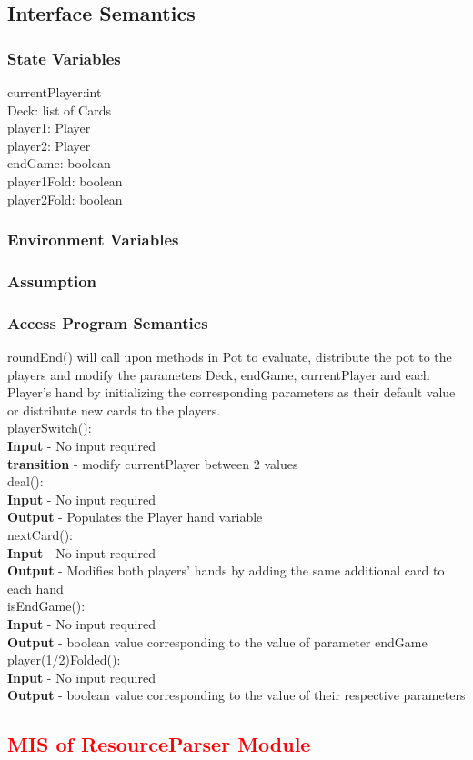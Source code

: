 \documentclass[11pt]{article}
\begin{document}
    \subsection{Interface Semantics}
    \subsubsection{State Variables}
    currentPlayer:int\\
    Deck: list of Cards\\
    player1: Player\\
    player2: Player\\
    endGame: boolean\\
    player1Fold: boolean\\
    player2Fold: boolean
    \subsubsection{Environment Variables}
    \subsubsection{Assumption}
    \subsubsection{Access Program Semantics}
 	roundEnd() will call upon methods in Pot to evaluate, distribute the pot to the players and modify the parameters Deck, endGame, currentPlayer and each Player's hand by initializing the corresponding parameters as their default value or distribute new cards to the players.\\
 	playerSwitch():\\
 	\textbf{Input} - No input required\\
 	\textbf{transition} - modify currentPlayer between 2 values\\
 	deal():\\
 	\textbf{Input} - No input required\\
 	\textbf{Output} - Populates the Player hand variable\\
 	nextCard():\\
 	\textbf{Input} - No input required\\
 	\textbf{Output} - Modifies both players' hands by adding the same additional card to each hand\\
 	isEndGame():\\
 	\textbf{Input} - No input required\\
 	\textbf{Output} - boolean value corresponding to the value of parameter endGame\\
 	player(1/2)Folded():\\
 	\textbf{Input} - No input required\\
 	\textbf{Output} - boolean value corresponding to the value of their respective parameters
 	\newline 
 	\textcolor{red}{
 	\section{MIS of ResourceParser Module}
    }
\end{document}
